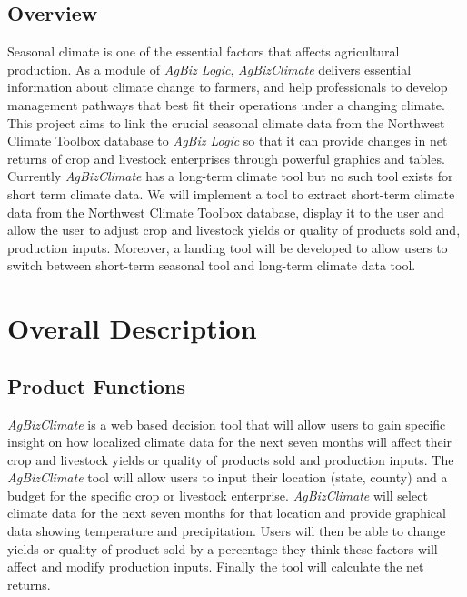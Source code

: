 \documentclass[onecolumn, draftclsnofoot,10pt, compsoc]{article}
\begin{document}
		\subsection{Overview}
			Seasonal climate is one of the essential factors that affects agricultural production. As a module of \textit{AgBiz Logic}, \textit{AgBizClimate} delivers essential information about climate change to farmers, and help professionals to develop management pathways that best fit their operations under a changing climate. This project aims to link the crucial seasonal climate data from the Northwest Climate Toolbox database to \textit{AgBiz Logic} so that it can provide changes in net returns of crop and livestock enterprises through powerful graphics and tables. \\
      Currently \textit{AgBizClimate} has a long-term climate tool but no such tool exists for short term climate data. We will implement a tool to extract short-term climate data from the Northwest Climate Toolbox database, display it to the user and allow the user to adjust crop and livestock yields or quality of products sold and, production inputs. Moreover, a landing tool will be developed to allow users to switch between short-term seasonal tool and long-term climate data tool.\\
\section{Overall Description}
	\subsection {Product Functions}
				\textit{AgBizClimate} is a web based decision tool that will allow users to gain specific insight on how localized climate data for the next seven months will affect their crop and livestock yields or quality of products sold and production inputs. The \textit{AgBizClimate} tool will allow users to input their location (state, county) and a budget for the specific crop or livestock enterprise. \textit{AgBizClimate} will select climate data for the next seven months for that location and provide graphical data showing temperature and precipitation. Users will then be able to change yields or quality of product sold by a percentage they think these factors will affect and modify production inputs. Finally the tool will calculate the net returns.\\
\end{document}
